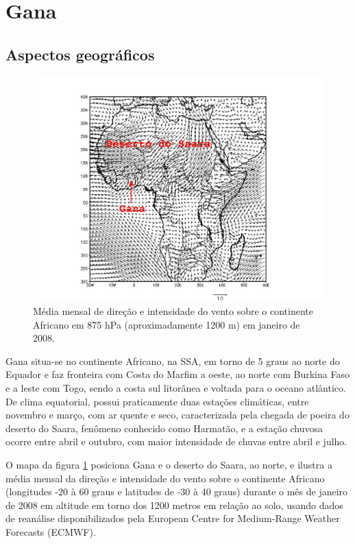 \newpage
\section{Gana}

\subsection{Aspectos geográficos}

\begin{figure}[H]
  \centering
  \includegraphics[width=\textwidth]{../inputs/grads/gimp/875hPa/JAN_2008.pdf}
  \caption{Média mensal de direção e intensidade do vento sobre o continente 
           Africano em 875 hPa (aproximadamente 1200 m) em janeiro de 2008.
          \label{fg:ECMWFjan2008}}
\end{figure}

Gana situa-se no continente Africano, na SSA, em torno de 5 graus ao norte 
do Equador e  faz fronteira com Costa do Marfim a oeste, ao norte com Burkina
Faso e a leste com Togo, sendo a costa sul litorânea e voltada para o oceano 
atlântico.
De clima equatorial, possui praticamente duas estações climáticas, 
entre novembro e março, com ar quente e seco, caracterizada pela chegada de
poeira do deserto do Saara, fenômeno conhecido como Harmatão, e a estação 
chuvosa ocorre entre abril e outubro, com maior intensidade de chuvas 
entre abril e julho. 

O mapa da figura \ref{fg:ECMWFjan2008} posiciona Gana e o deserto do Saara, 
ao norte, e ilustra a média mensal da direção e intensidade do vento 
sobre o continente Africano (longitudes -20 à 60 graus e latitudes de -30 à 40 
graus) durante o mês de janeiro de 2008 em altitude em torno dos 1200 metros 
em relação ao solo, usando dados de reanálise disponibilizados pela 
European Centre for Medium-Range Weather Forecasts (ECMWF). 


